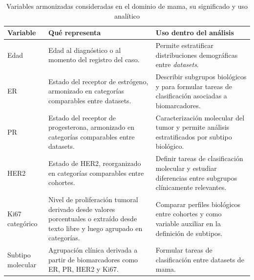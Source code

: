 \begin{table}
    \centering
    \caption{Variables armonizadas consideradas en el dominio de mama, su significado y uso analítico}
    \label{tab:variables_armonizadas_significado}

    \begin{tabular}{p{2.8cm}p{5.0cm}p{6.0cm}}

        \toprule

        \textbf{Variable} &
        \textbf{Qué representa} &
        \textbf{Uso dentro del análisis} \\

        \midrule

        Edad &
        Edad al diagnóstico o al momento del registro del caso. &
        Permite estratificar distribuciones demográficas entre \textit{datasets}. \\

        ER &
        Estado del receptor de estrógeno, armonizado en categorías comparables entre datasets. &
        Describir subgrupos biológicos y para formular tareas de clasificación asociadas a biomarcadores. \\

        PR &
        Estado del receptor de progesterona, armonizado en categorías comparables entre datasets. &
        Caracterización molecular del tumor y permite análisis estratificados por subtipo biológico. \\

        HER2 &
        Estado de HER2, reorganizado en categorías comparables entre cohortes. &
        Definir tareas de clasificación molecular y estudiar diferencias entre subgrupos clínicamente relevantes. \\

        Ki67 categórico &
        Nivel de proliferación tumoral derivado desde valores porcentuales o extraído desde texto libre y luego agrupado en categorías. &
        Comparar perfiles biológicos entre cohortes y como variable auxiliar en la definición de subtipos. \\

        Subtipo molecular &
        Agrupación clínica derivada a partir de biomarcadores como ER, PR, HER2 y Ki67. &
        Formular tareas de clasificación entre datasets de mama. \\

        \bottomrule

    \end{tabular}
\end{table}

